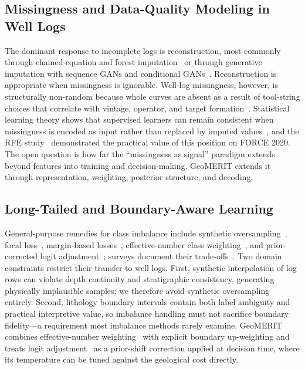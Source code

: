 \documentclass[bdcc,article,submit,pdftex,moreauthors]{Definitions/mdpi}
\begin{document}
\subsection{Missingness and Data-Quality Modeling in Well Logs}
The dominant response to incomplete logs is reconstruction, most commonly through chained-equation
and forest imputation~\cite{vanbuuren2011mice,stekhoven2012missforest} or through generative
imputation with sequence GANs and conditional GANs~\cite{liu2025wellgan,xie2024cgan}. Reconstruction is
appropriate when missingness is ignorable. Well-log missingness, however, is structurally
non-random because whole curves are absent as a result of tool-string choices that correlate
with vintage, operator, and target formation~\cite{chen2026rfe}. Statistical learning theory shows
that supervised learners can remain consistent when missingness is encoded as input rather
than replaced by imputed values~\cite{little2019stats,josse2024missing}, and the RFE
study~\cite{chen2026rfe} demonstrated the practical value of this position on FORCE 2020.
The open question is how far the ``missingness as signal'' paradigm extends beyond features
into training and decision-making. GeoMERIT extends it through representation, weighting,
posterior structure, and decoding.

\subsection{Long-Tailed and Boundary-Aware Learning}
General-purpose remedies for class imbalance include synthetic
oversampling~\cite{chawla2002smote}, focal loss~\cite{lin2017focal}, margin-based
losses~\cite{cao2019ldam}, effective-number class weighting~\cite{cui2019classbalanced}, and
prior-corrected logit adjustment~\cite{menon2021logit}; surveys document their
trade-offs~\cite{he2024imbalanced}. Two domain constraints restrict their transfer to well
logs. First, synthetic interpolation of log rows can violate depth continuity and
stratigraphic consistency, generating physically implausible samples; we therefore avoid
synthetic oversampling entirely. Second, lithology boundary intervals contain both label
ambiguity and practical interpretive value, so imbalance handling must not sacrifice boundary
fidelity---a requirement most imbalance methods rarely examine. GeoMERIT combines
effective-number weighting~\cite{cui2019classbalanced} with explicit boundary up-weighting and
treats logit adjustment~\cite{menon2021logit} as a prior-shift correction applied at decision
time, where its temperature can be tuned against the geological cost directly.
\end{document}
